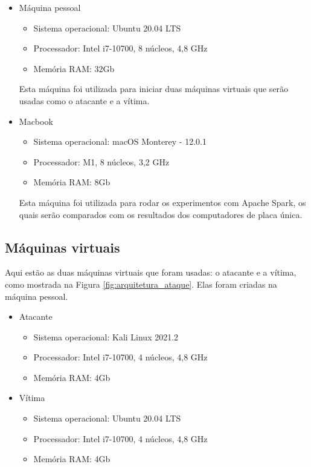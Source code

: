 \begin{itemize}
    \item Máquina pessoal
        \begin{itemize}
            \item Sistema operacional: Ubuntu 20.04 LTS
            \item Processador: Intel i7-10700, 8 núcleos, 4,8 GHz
            \item Memória RAM: 32Gb
        \end{itemize}
        Esta máquina foi utilizada para iniciar duas máquinas virtuais que serão usadas 
        como o atacante e a vítima.
    \item Macbook 
        \begin{itemize}
            \item Sistema operacional: macOS Monterey - 12.0.1
            \item Processador: M1, 8 núcleos, 3,2 GHz
            \item Memória RAM: 8Gb
        \end{itemize}        
        Esta máquina foi utilizada para rodar os experimentos com Apache Spark, os quais 
        serão comparados com os resultados dos computadores de placa única.
\end{itemize}


\subsection{Máquinas virtuais}

Aqui estão as duas máquinas virtuais que foram usadas: o atacante e a vítima, como mostrada na Figura \ref{fig:arquitetura_ataque}. 
Elas foram criadas na máquina pessoal.

\begin{itemize}
    \item Atacante
        \begin{itemize}
            \item Sistema operacional: Kali Linux 2021.2
            \item Processador: Intel i7-10700, 4 núcleos, 4,8 GHz
            \item Memória RAM: 4Gb
        \end{itemize}
    \item Vítima
        \begin{itemize}
            \item Sistema operacional: Ubuntu 20.04 LTS
            \item Processador: Intel i7-10700, 4 núcleos, 4,8 GHz
            \item Memória RAM: 4Gb
        \end{itemize}        
\end{itemize}



